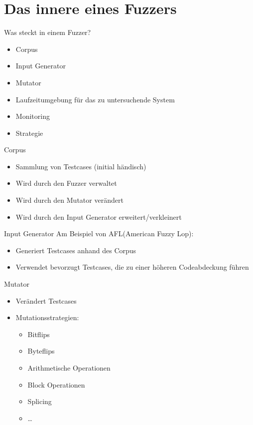
\section{Das innere eines Fuzzers}\label{sec:das-innere-eines-fuzzers}
\begin{frame}{Was steckt in einem Fuzzer?}
    \begin{itemize}
        \item \alert{Corpus}
        \item Input Generator
        \item Mutator
        \item Laufzeitumgebung für das zu untersuchende System
        \item Monitoring
        \item \alert{Strategie}
    \end{itemize}
\end{frame}
\begin{frame}{Corpus}
    \begin{itemize}
        \item Sammlung von Testcases (initial händisch)
        \item Wird durch den Fuzzer verwaltet
        \item Wird durch den Mutator verändert
        \item Wird durch den Input Generator erweitert/verkleinert
    \end{itemize}
\end{frame}
\begin{frame}{Input Generator}
    Am Beispiel von AFL(American Fuzzy Lop):
    \begin{itemize}
        \item Generiert Testcases anhand des Corpus
        \item Verwendet bevorzugt Testcases, die zu einer höheren Codeabdeckung führen
    \end{itemize}
\end{frame}
\begin{frame}{Mutator}
    \begin{itemize}
        \item Verändert Testcases
        \item Mutationsstrategien:
              \begin{itemize}
                  \item Bitflips
                  \item Byteflips
                  \item Arithmetische Operationen
                  \item Block Operationen
                  \item Splicing
                  \item \ldots
              \end{itemize}
    \end{itemize}
\end{frame}

